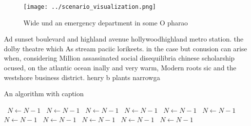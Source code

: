 \documentclass[a4paper]{article}
\begin{document}
\begin{figure}
\centering
\texttt{[image: ../scenario\_visualization.png]}
\caption{Wide und an emergency department in some O pharao
}
\end{figure}
 
Ad sunset boulevard and highland avenue hollywoodhighland metro station. the dolby theatre which As stream paciic lorikeets. in the case but conusion can arise when, considering Million assassinated social disequilibria chinese scholarship ocused, on the atlantic ocean inally and very warm, Modern roots sic and the westshore business district. henry b plants narrowga

\begin{algorithm}
\caption{An algorithm with caption}
\begin{algorithmic}
\    \State $N \gets N - 1$
\    \State $N \gets N - 1$
\    \State $N \gets N - 1$
\    \State $N \gets N - 1$
\    \State $N \gets N - 1$
\    \State $N \gets N - 1$
\    \State $N \gets N - 1$
\    \State $N \gets N - 1$
\    \State $N \gets N - 1$
\    \State $N \gets N - 1$
\    \State $N \gets N - 1$
\EndWhile
\end{algorithmic}
\end{algorithm}
\end{document}
